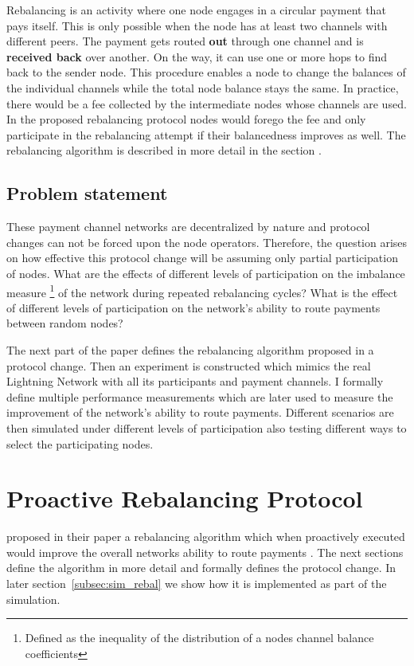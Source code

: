\documentclass[final]{fhnwreport}       %
\begin{document}
Rebalancing is an activity where one node engages in a circular payment that pays itself. This is only possible when the node has at least two channels with different peers. The payment gets routed \textbf{out} through one channel and is \textbf{received back} over another. On the way, it can use one or more hops to find back to the sender node. This procedure enables a node to change the balances of the individual channels while the total node balance stays the same. In practice, there would be a fee collected by the intermediate nodes whose channels are used. In the proposed rebalancing protocol nodes would forego the fee and only participate in the rebalancing attempt if their balancedness improves as well. The rebalancing algorithm is described in more detail in the section . 


\subsection{Problem statement}
These payment channel networks are decentralized by nature and protocol changes can not be forced upon the node operators. Therefore, the question arises on how effective this protocol change will be assuming only partial participation of nodes. What are the effects of different levels of participation on the imbalance measure \footnote{Defined as the inequality of the distribution of a nodes channel balance coefficients} of the network during repeated rebalancing cycles? What is the effect of different levels of participation on the network's ability to route payments between random nodes? 

The next part of the paper defines the rebalancing algorithm proposed in a protocol change. Then an experiment is constructed which mimics the real Lightning Network with all its participants and payment channels. I formally define multiple performance measurements which are later used to measure the improvement of the network's ability to route payments. Different scenarios are then simulated under different levels of participation also testing different ways to select the participating nodes.

\newpage
\section{Proactive Rebalancing Protocol}
\citeauthor{pickhardt_imbalance_2019} proposed in their paper a rebalancing algorithm which when proactively executed would improve the overall networks ability to route payments \citep{pickhardt_imbalance_2019}. The next sections define the algorithm in more detail and formally defines the protocol change. In later section~\ref{subsec:sim_rebal} we show how it is implemented as part of the simulation.
\end{document}
